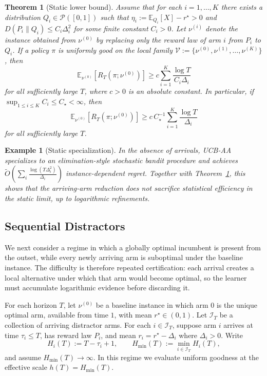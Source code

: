 \documentclass[
  12pt]{article}
\newtheorem{theorem}{Theorem}
\newtheorem{example}{Example}
\begin{document}
\begin{theorem}[Static lower bound]
\label{thm:static-lb-local-quadratic}
Assume that for each $i=1,\dots,K$ there exists a distribution $Q_i\in\mathcal P([0,1])$ such
that
\(
\eta_i:=\mathbb E_{Q_i}[X]-r^\star>0\) and
\(
D(P_i\|Q_i)\le C_i\Delta_i^2
\)
for some finite constant $C_i>0$. Let $\nu^{(i)}$ denote the instance obtained from $\nu^{(0)}$
by replacing only the reward law of arm $i$ from $P_i$ to $Q_i$. If a policy $\pi$ is uniformly
good on the local family $\mathcal V:=\{\nu^{(0)},\nu^{(1)},\dots,\nu^{(K)}\}$, then
\[
\mathbb E_{\nu^{(0)}}[R_T(\pi;\nu^{(0)})]
\ge
c\sum_{i=1}^K \frac{\log T}{C_i\Delta_i}
\]
for all sufficiently large $T$, where $c>0$ is an absolute constant. In particular, if $\sup_{1\le i\le K} C_i\le C_\star<\infty$, then
\[
\mathbb E_{\nu^{(0)}}[R_T(\pi;\nu^{(0)})]
\ge
c\,C_\star^{-1}\sum_{i=1}^K \frac{\log T}{\Delta_i}
\]
for all sufficiently large $T$.
\end{theorem}



\begin{example}[Static specialization]
\label{exp:static}
In the absence of arrivals, UCB-AA specializes to an elimination-style stochastic bandit
procedure and achieves
\(
\tilde O\left(\sum_i \frac{\log(T\Delta_i^2)}{\Delta_i}\right)
\)
instance-dependent regret. Together with
Theorem~\ref{thm:static-lb-local-quadratic}, this shows that the arriving-arm reduction does
not sacrifice statistical efficiency in the static limit, up to logarithmic refinements.
\end{example}

\subsection{Sequential Distractors}

We next consider a regime in which a globally optimal incumbent is present from the outset,
while every newly arriving arm is suboptimal under the baseline instance. The difficulty is
therefore repeated certification: each arrival creates a local alternative under which that arm
would become optimal, so the learner must accumulate logarithmic evidence before discarding it.

For each horizon $T$, let $\nu^{(0)}$ be a baseline instance in which arm $0$ is the unique
optimal arm, available from time $1$, with mean $r^\star\in(0,1)$. Let $\mathcal I_T$ be a
collection of arriving distractor arms. For each $i\in\mathcal I_T$, suppose arm $i$ arrives at
time $\tau_i\le T$, has reward law $P_i$, and mean
\(
r_i=r^\star-\Delta_i
\) where \(
\Delta_i>0.
\)
Write
\[
H_i(T):=T-\tau_i+1,
\qquad
H_{\min}(T):=\min_{i\in\mathcal I_T}H_i(T),
\]
and assume $H_{\min}(T)\to\infty$. In this regime we evaluate uniform goodness at the effective
scale $h(T)=H_{\min}(T)$.
\end{document}
